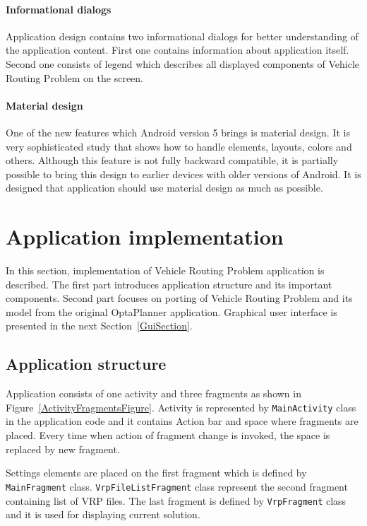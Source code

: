 \paragraph{Informational dialogs}
Application design contains two informational dialogs for better understanding of the application content. First one
contains information about application itself. Second one consists of legend which describes all displayed components of
Vehicle Routing Problem on the screen.

\paragraph{Material design}
One of the new features which Android version 5 brings is material design. It is very sophisticated study that shows how
to handle elements, layouts, colors and others. Although this feature is not fully backward compatible, it is partially
possible to bring this design to earlier devices with older versions of Android. It is designed that application should
use material design as much as possible.

\section{Application implementation}\label{ApplicationImplementationSection}
In this section, implementation of Vehicle Routing Problem application is described. The first part introduces
application structure and its important components. Second part focuses on porting of Vehicle Routing Problem and its
model from the original OptaPlanner application. Graphical user interface is presented in the next
Section~\ref{GuiSection}.

\subsection{Application structure}
Application consists of one activity and three fragments as shown in Figure~\ref{ActivityFragmentsFigure}. Activity is
represented by \texttt{MainActivity} class in the application code and it contains Action bar and space where fragments
are placed. Every time when action of fragment change is invoked, the space is replaced by new fragment.

Settings elements are placed on the first fragment which is defined by \texttt{MainFragment} class.
\texttt{VrpFileListFragment} class represent the second fragment containing list of VRP files. The last fragment is
defined by \texttt{VrpFragment} class and it is used for displaying current solution.


